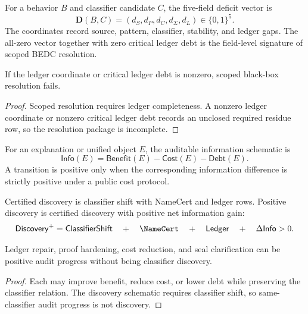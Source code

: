 \begin{definition}
\label{def:philosophy-five-field-deficit-schematic}
For a behavior $B$ and classifier candidate $C$, the five-field deficit
vector is
$$
\mathbf D(B,C)
=
(d_S,d_P,d_C,d_\Sigma,d_L)\in\{0,1\}^5.
$$
The coordinates record source, pattern, classifier, stability, and
ledger gaps. The all-zero vector together with zero critical ledger debt
is the field-level signature of scoped BEDC resolution.
\end{definition}

\begin{theorem}
\label{thm:philosophy-ledger-gaps-dominate-scoped-resolution}
If the ledger coordinate or critical ledger debt is nonzero, scoped
black-box resolution fails.
\end{theorem}
\begin{proof}
Scoped resolution requires ledger completeness. A nonzero ledger
coordinate or nonzero critical ledger debt records an unclosed required
residue row, so the resolution package is incomplete.
\end{proof}

\begin{definition}
\label{def:philosophy-information-schematic}
For an explanation or unified object $E$, the auditable information
schematic is
$$
\mathsf{Info}(E)
=
\mathsf{Benefit}(E)
-
\mathsf{Cost}(E)
-
\mathsf{Debt}(E).
$$
A transition is positive only when the corresponding information
difference is strictly positive under a public cost protocol.
\end{definition}

\begin{definition}
\label{def:philosophy-discovery-schematic}
Certified discovery is classifier shift with NameCert and ledger rows.
Positive discovery is certified discovery with positive net information
gain:
$$
\mathsf{Discovery}^{+}
=
\mathsf{ClassifierShift}
\quad+\quad
\NameCert
\quad+\quad
\mathsf{Ledger}
\quad+\quad
\Delta\mathsf{Info}>0.
$$
\end{definition}

\begin{theorem}
\label{thm:philosophy-audit-progress-discovery-separate-schematic}
Ledger repair, proof hardening, cost reduction, and seal clarification
can be positive audit progress without being classifier discovery.
\end{theorem}
\begin{proof}
Each may improve benefit, reduce cost, or lower debt while preserving
the classifier relation. The discovery schematic requires classifier
shift, so same-classifier audit progress is not discovery.
\end{proof}

